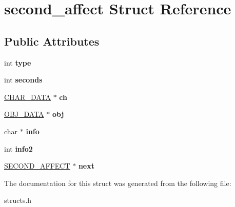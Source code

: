 \hypertarget{structsecond__affect}{\section{second\-\_\-affect Struct Reference}
\label{structsecond__affect}
}
\subsection*{Public Attributes}
\begin{DoxyCompactItemize}
\item 
\hypertarget{structsecond__affect_a5fbce7cebaf58b39351eb73328961c8e}{int {\bfseries type}}\label{structsecond__affect_a5fbce7cebaf58b39351eb73328961c8e}

\item 
\hypertarget{structsecond__affect_a1733466c66a4c38c8827ea8f04ebb95c}{int {\bfseries seconds}}\label{structsecond__affect_a1733466c66a4c38c8827ea8f04ebb95c}

\item 
\hypertarget{structsecond__affect_a84480e01f74f2675eeedd316136ff2df}{\hyperlink{structchar__data}{C\-H\-A\-R\-\_\-\-D\-A\-T\-A} $\ast$ {\bfseries ch}}\label{structsecond__affect_a84480e01f74f2675eeedd316136ff2df}

\item 
\hypertarget{structsecond__affect_a7ecf982e7b8695beeb66092f9fda651a}{\hyperlink{structobj__data}{O\-B\-J\-\_\-\-D\-A\-T\-A} $\ast$ {\bfseries obj}}\label{structsecond__affect_a7ecf982e7b8695beeb66092f9fda651a}

\item 
\hypertarget{structsecond__affect_ab92fc06ae75014b5bf4d66270176b2c8}{char $\ast$ {\bfseries info}}\label{structsecond__affect_ab92fc06ae75014b5bf4d66270176b2c8}

\item 
\hypertarget{structsecond__affect_acf12f75277cf3a76670c8ed0e647c7e1}{int {\bfseries info2}}\label{structsecond__affect_acf12f75277cf3a76670c8ed0e647c7e1}

\item 
\hypertarget{structsecond__affect_ad173636951c2d251f5228a0eb987a267}{\hyperlink{structsecond__affect}{S\-E\-C\-O\-N\-D\-\_\-\-A\-F\-F\-E\-C\-T} $\ast$ {\bfseries next}}\label{structsecond__affect_ad173636951c2d251f5228a0eb987a267}

\end{DoxyCompactItemize}


The documentation for this struct was generated from the following file\-:\begin{DoxyCompactItemize}
\item 
structs.\-h\end{DoxyCompactItemize}
